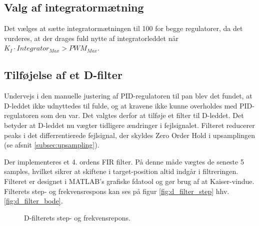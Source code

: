 \subsection{Valg af integratormætning}
Det vælges at sætte integratormætningen til 100 for begge regulatorer, da det vurderes, at der drages
fuld nytte af integratorleddet når \( K_I \cdot Integrator_{Max} > PWM_{Max} \).

\subsection{Tilføjelse af et D-filter}
Undervejs i den manuelle justering af PID-regulatoren til pan blev det fundet, at D-leddet ikke udnyttedes til fulde,
og at kravene ikke kunne overholdes med PID-regulatoren som den var.
Det valgtes derfor at tilføje et filter til D-leddet. 
Det betyder at D-leddet nu vægter tidligere ændringer i fejlsignalet. 
Filteret reducerer peaks i det differrentierede fejlsignal, der skyldes Zero Order Hold i upsamplingen (se afsnit \ref{subsec:upsampling}).

Der implementeres et 4. ordens FIR filter. På denne måde vægtes de seneste 5 samples, hvilket sikrer at skiftene i target-position altid indgår i filtreringen.
Filteret er designet i MATLAB's grafiske fdatool og gør brug af at Kaiser-vindue.
Filterets step- og frekvensrespons kan ses på figur \ref{fig:d_filter_step} hhv. \ref{fig:d_filter_bode}. 

\begin{figure}[h!]
\centering
{}
\caption[D-filterets respons]{D-filterets step- og frekvensrepons.}
\label{fig:d_filter}
\end{figure}

